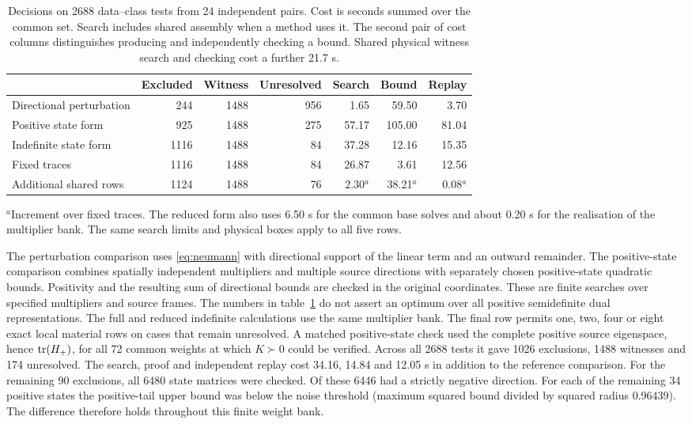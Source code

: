 \begin{table}[tb]\centering
\caption{Decisions on 2688 data--class tests from 24 independent pairs. Cost is seconds summed over the common set. Search includes shared assembly when a method uses it. The second pair of cost columns distinguishes producing and independently checking a bound. Shared physical witness search and checking cost a further 21.7 s.}\label{tab:a}
\small
\begin{tabular}{@{}lrrrrrr@{}}\toprule
 & Excluded & Witness & Unresolved & Search & Bound & Replay\\\midrule
Directional perturbation &244&1488&956&1.65&59.50&3.70\\
Positive state form &925&1488&275&57.17&105.00&81.04\\
Indefinite state form &1116&1488&84&37.28&12.16&15.35\\
Fixed traces &1116&1488&84&26.87&3.61&12.56\\
Additional shared rows &1124&1488&76&2.30$^a$&38.21$^a$&0.08$^a$\\\bottomrule
\end{tabular}
\par\smallskip\parbox{.93\linewidth}{\footnotesize $^a$Increment over fixed traces. The reduced form also uses 6.50 s for the common base solves and about 0.20 s for the realisation of the multiplier bank. The same search limits and physical boxes apply to all five rows.}
\end{table}
The perturbation comparison uses \eqref{eq:neumann} with directional support of the linear term and an outward remainder. The positive-state comparison combines spatially independent multipliers and multiple source directions with separately chosen positive-state quadratic bounds. Positivity and the resulting sum of directional bounds are checked in the original coordinates. These are finite searches over specified multipliers and source frames. The numbers in table~\ref{tab:a} do not assert an optimum over all positive semidefinite dual representations. The full and reduced indefinite calculations use the same multiplier bank. The final row permits one, two, four or eight exact local material rows on cases that remain unresolved. A matched positive-state check used the complete positive source eigenspace, hence $\operatorname{tr}(H_+)$, for all 72 common weights at which $K\succ0$ could be verified. Across all 2688 tests it gave 1026 exclusions, 1488 witnesses and 174 unresolved. The search, proof and independent replay cost 34.16, 14.84 and 12.05 s in addition to the reference comparison. For the remaining 90 exclusions, all 6480 state matrices were checked. Of these 6446 had a strictly negative direction. For each of the remaining 34 positive states the positive-tail upper bound was below the noise threshold (maximum squared bound divided by squared radius 0.96439). The difference therefore holds throughout this finite weight bank.

